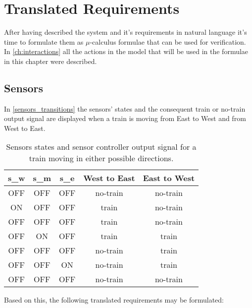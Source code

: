 \documentclass[final]{report}
\begin{document}
\chapter{Translated Requirements}
After having described the system and it's requirements in natural language it's time to formulate them as $\mu$-calculus formulae that can be used for verification. In \cref{ch:interactions} all the actions in the model that will be used in the formulae in this chapter were described.

\section{Sensors}
In \cref{sensors_transitions} the sensors' states and the consequent train or no-train output signal are displayed when a train is moving from East to West and from West to East.
\begin{table}[H]
\centering
\begin{tabular}{|c|c|c|c|c|}
\hline 
s\_w & s\_m & s\_e & West to East & East to West \\ 
\hline 
OFF & OFF & OFF & no-train & no-train \\ 
\hline 
ON & OFF & OFF & train & no-train \\ 
\hline 
OFF & OFF & OFF & train & no-train \\ 
\hline 
OFF & ON & OFF & train & train \\ 
\hline 
OFF & OFF & OFF & no-train & train \\ 
\hline 
OFF & OFF & ON & no-train & train \\ 
\hline 
OFF & OFF & OFF & no-train & no-train \\ 
\hline 
\end{tabular} 
\caption{Sensors states and sensor controller output signal for a train moving in either possible directions.}
\label{tb:sensors_transitions}
\end{table}
Based on this, the following translated requirements may be formulated: 
\end{document}
